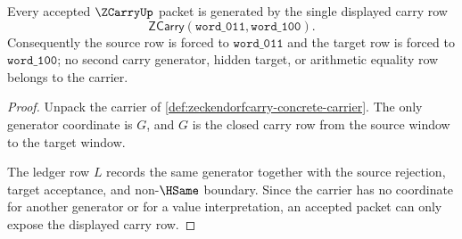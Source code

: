 \begin{theorem}
\label{thm:zeckendorfcarry-generator-boundary}
Every accepted $\ZCarryUp$ packet is generated by the single displayed carry row
$$
\mathsf{ZCarry}(\mathtt{word\_011},\mathtt{word\_100}).
$$
Consequently the source row is forced to $\mathtt{word\_011}$ and the target row is forced to $\mathtt{word\_100}$; no second carry generator, hidden target, or arithmetic equality row belongs to the carrier.
\end{theorem}
\begin{proof}
Unpack the carrier of \autoref{def:zeckendorfcarry-concrete-carrier}. The only generator coordinate is $G$, and $G$ is the closed carry row from the source window to the target window.

The ledger row $L$ records the same generator together with the source rejection, target acceptance, and non-$\HSame$ boundary. Since the carrier has no coordinate for another generator or for a value interpretation, an accepted packet can only expose the displayed carry row.
\end{proof}

